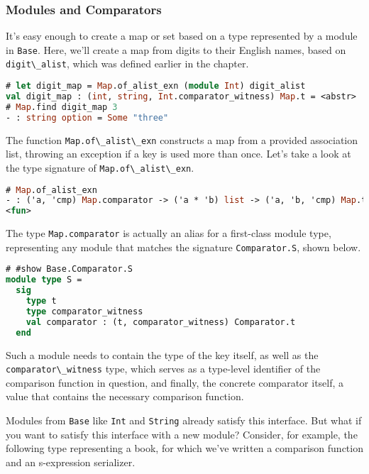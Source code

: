 \hypertarget{modules-and-comparators}{%
\subsubsection{Modules and Comparators}\label{modules-and-comparators}}

It's easy enough to create a map or set based on a type represented by a
module in \passthrough{\lstinline!Base!}. Here, we'll create a map from
digits to their English names, based on
\passthrough{\lstinline!digit\_alist!}, which was defined earlier in the
chapter.

\begin{lstlisting}[language=Caml]
# let digit_map = Map.of_alist_exn (module Int) digit_alist
val digit_map : (int, string, Int.comparator_witness) Map.t = <abstr>
# Map.find digit_map 3
- : string option = Some "three"
\end{lstlisting}

The function \passthrough{\lstinline!Map.of\_alist\_exn!} constructs a
map from a provided association list, throwing an exception if a key is
used more than once. Let's take a look at the type signature of
\passthrough{\lstinline!Map.of\_alist\_exn!}.

\begin{lstlisting}[language=Caml]
# Map.of_alist_exn
- : ('a, 'cmp) Map.comparator -> ('a * 'b) list -> ('a, 'b, 'cmp) Map.t =
<fun>
\end{lstlisting}

The type \passthrough{\lstinline!Map.comparator!} is actually an alias
for a first-class module type, representing any module that matches the
signature \passthrough{\lstinline!Comparator.S!}, shown below.

\begin{lstlisting}[language=Caml]
# #show Base.Comparator.S
module type S =
  sig
    type t
    type comparator_witness
    val comparator : (t, comparator_witness) Comparator.t
  end
\end{lstlisting}

Such a module needs to contain the type of the key itself, as well as
the \passthrough{\lstinline!comparator\_witness!} type, which serves as
a type-level identifier of the comparison function in question, and
finally, the concrete comparator itself, a value that contains the
necessary comparison function.

Modules from \passthrough{\lstinline!Base!} like
\passthrough{\lstinline!Int!} and \passthrough{\lstinline!String!}
already satisfy this interface. But what if you want to satisfy this
interface with a new module? Consider, for example, the following type
representing a book, for which we've written a comparison function and
an s-expression serializer.

